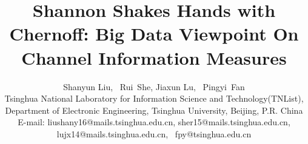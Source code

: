 \documentclass[conference]{IEEEtran}
\begin{document}
%
\title{Shannon Shakes Hands with Chernoff: Big Data Viewpoint On Channel Information Measures}
%
%
%

\author{Shanyun Liu, ~Rui~She, Jiaxun Lu, ~Pingyi~Fan\\

\small
Tsinghua National Laboratory for Information Science and Technology(TNList),\\
Department of Electronic Engineering, Tsinghua University, Beijing, P.R. China\\
E-mail: liushany16@mails.tsinghua.edu.cn, sher15@mails.tsinghua.edu.cn, lujx14@mails.tsinghua.edu.cn, ~fpy@tsinghua.edu.cn}

%
%



%
\end{document}
